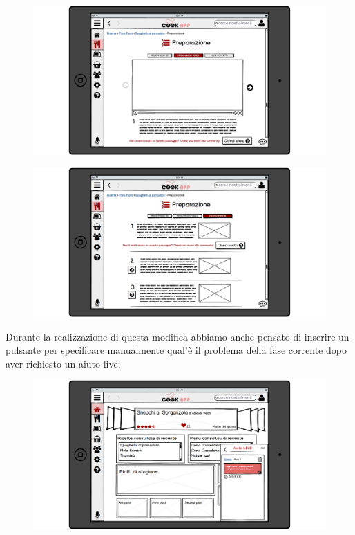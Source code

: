 \begin{figure}[H]
	\includegraphics[width=\linewidth]{img/mockup/Ricetta4-fixed.png}
\end{figure}

\begin{figure}[H]
	\includegraphics[width=\linewidth]{img/mockup/Ricetta5-fixed.png}
\end{figure}

Durante la realizzazione di questa modifica abbiamo anche
pensato di inserire un pulsante per specificare manualmente qual'è il
problema della fase corrente dopo aver richiesto un aiuto live.

\begin{figure}[H]
	\includegraphics[width=\linewidth]{img/mockup/Live2-fixed.png}
\end{figure}

